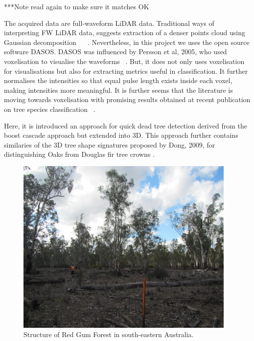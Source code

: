 \documentclass{subfiles}
\begin{document}
{\color{red} ***Note read again to make sure it matches OK}
\par The acquired data are full-waveform LiDAR data. Traditional ways of interpreting FW LiDAR data, suggests extraction of a denser points cloud using Gaussian decomposition ~\cite{Neuenschwander2009} ~\cite{Reitberger2008}. Nevertheless, in this project we uses the open source software DASOS. DASOS was influenced by Persson et al, 2005, who used voxelisation to visualise the waveforms ~\cite{Persson2005}. But, it does not only uses voxelisation for visualisations but also for extracting metrics useful in classification. It further normalises the intensities so that equal pulse length exists inside each voxel, making intensities more meaningful. It is further seems that the literature is moving towards voxelisation with promising results obtained at recent publication on tree species classification ~\cite{Cao2016}. 

\par Here, it is introduced an approach for quick dead tree detection derived from the boost cascade approach \cite{Viola2001} but extended into 3D. This approach further contains similaries of the 3D tree shape signatures proposed by Dong, 2009, for distinguishing Oaks from Douglas fir tree crowns \cite{Dong2009}. 






	\begin{figure} [h!]
		\centering
		\includegraphics[width=0.965\textwidth]{img/Eucalyptus.png}
		\caption{Structure of Red Gum Forest in south-eastern Australia.}
		\label{fig:EucalyptusSize}
	\end{figure}
	
\end{document}
